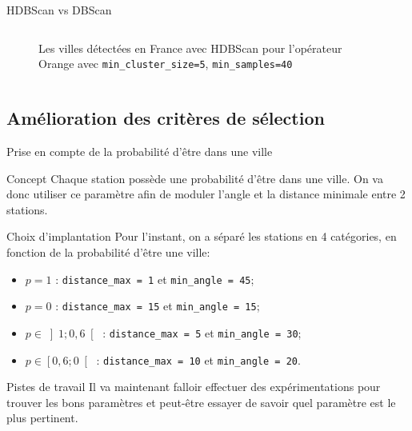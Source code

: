 \begin{frame}{HDBScan vs DBScan}
\begin{columns}
\begin{column}{0.5\textwidth}
\begin{figure}
                \caption{\label{fig:HDBSCAN-bis}Les villes détectées en France avec HDBScan pour l'opérateur Orange avec \texttt{min\_cluster\_size=5}, \texttt{min\_samples=40}}
            \end{figure}
        \end{column}
    \end{columns}
\end{frame}

\subsection{Amélioration des critères de sélection}
\insertsubsectionframe

\begin{frame}{Prise en compte de la probabilité d'être dans une ville}
    \begin{block}{Concept}
        Chaque station possède une probabilité d'être dans une ville.
        On va donc utiliser ce paramètre afin de moduler l'angle et la distance minimale entre 2 stations.
    \end{block}

    \begin{block}{Choix d'implantation}
        Pour l'instant, on a séparé les stations en 4 catégories, en fonction de la probabilité d'être une ville:
        \begin{itemize}
            \item $p=1$ : \texttt{distance\_max = 1} et \texttt{min\_angle = 45};
            \item $p=0$ : \texttt{distance\_max = 15} et \texttt{min\_angle = 15};
            \item $p\in\left]1 ; 0,6\right[$ : \texttt{distance\_max = 5} et \texttt{min\_angle = 30};
            \item $p\in\left[0,6 ; 0\right[$ : \texttt{distance\_max = 10} et \texttt{min\_angle = 20}.
        \end{itemize}
    \end{block}
    
    \begin{alertblock}{Pistes de travail}
        Il va maintenant falloir effectuer des expérimentations pour trouver les bons paramètres et peut-être essayer de savoir quel paramètre est le plus pertinent.
    \end{alertblock}
\end{frame}

